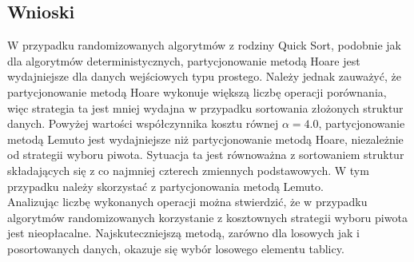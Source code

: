 \begin{figure}[]
	\centering
	
	\caption[]{}
	\label{fig:quick-sort-nondeterministic-pivot-random}
\end{figure}

\begin{figure}[]
	\centering
	
	\caption[]{}
	\label{fig:quick-sort-nondeterministic-pivot-reversed}
\end{figure}

\begin{figure}[]
	\centering
	
	\caption[]{}
	\label{fig:quick-sort-nondeterministic-pivot-cost-factor}
\end{figure}

\begin{figure}[]
	\centering
	
	\caption[]{}
	\label{fig:quick-sort-nondeterministic-pivot-density}
\end{figure}

\begin{figure}[]
	\centering
	
	\caption[]{}
	\label{fig:quick-sort-nondeterministic-pivot-random-all}
\end{figure}

\subsection{Wnioski}
W przypadku randomizowanych algorytmów z rodziny Quick Sort, podobnie jak dla algorytmów deterministycznych, partycjonowanie metodą Hoare jest wydajniejsze dla danych wejściowych typu prostego. Należy jednak zauważyć, że partycjonowanie metodą Hoare wykonuje większą liczbę operacji porównania, więc strategia ta jest mniej wydajna w przypadku sortowania złożonych struktur danych. Powyżej wartości współczynnika kosztu równej $\alpha = 4.0$, partycjonowanie metodą Lemuto jest wydajniejsze niż partycjonowanie metodą Hoare, niezależnie od strategii wyboru piwota. Sytuacja ta jest równoważna z sortowaniem struktur składających się z co najmniej czterech zmiennych podstawowych. W tym przypadku należy skorzystać z partycjonowania metodą Lemuto.\\

Analizując liczbę wykonanych operacji można stwierdzić, że w przypadku algorytmów randomizowanych korzystanie z kosztownych strategii wyboru piwota jest nieopłacalne. Najskuteczniejszą metodą, zarówno dla losowych jak i posortowanych danych, okazuje się wybór losowego elementu tablicy.\\
